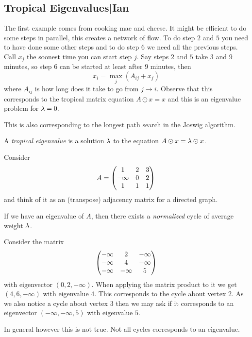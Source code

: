 \documentclass[12pt]{memoir}
\begin{document}
\subsection{Tropical Eigenvalues|Ian}

\begin{Ex}
    The first example comes from cooking mac and cheese. It might be efficient to do some steps in parallel, this creates a network of flow. To do step $2$ and $5$ you need to have done some other steps and to do step $6$ we need all the previous steps. Call $x_j$ the soonest time you can start step $j$. Say steps $2$ and $5$ take $3$ and $9$ minutes, so step $6$ can be started at least after $9$ minutes, then 
    $$x_i=\max_j(A_{ij}+x_j)$$
    where $A_{ij}$ is how long does it take to go from $j\to i$. Observe that this corresponds to the tropical matrix equation $A\odot x=x$ and this is an eigenvalue problem for $\lambda=0$.
\end{Ex}

\begin{Rmk}
This is also corresponding to the longest path search in the Joswig algorithm.
\end{Rmk}

\begin{Def}
    A \emph{tropical eigenvalue} is a solution $\lambda$ to the equation $A\odot x=\lambda\odot x$.
\end{Def}

\begin{Ex}
    Consider 
    $$A=\begin{pmatrix} 1 & 2 & 3 \\ -\infty & 0 & 2 \\ 1 & 1 & 1 \end{pmatrix}$$
    and think of it as an (transpose) adjacency matrix for a directed graph. 
\end{Ex}

\begin{Lem}
If we have an eigenvalue of $A$, then there exists a \emph{normalized} cycle of average weight $\lambda$.
\end{Lem}

\begin{Ex}
    Consider the matrix 
    $$\begin{pmatrix} -\infty & 2 & -\infty \\ -\infty & 4 & -\infty \\ -\infty & -\infty & 5 \end{pmatrix}$$
    with eigenvector $(0,2,-\infty)$. When applying the matrix product to it we get $(4,6,-\infty)$ with eigenvalue $4$. This corresponds to the cycle about vertex $2$. As we also notice a cycle about vertex $3$ then we may ask if it corresponds to an eigenvector $(-\infty,-\infty,5)$ with eigenvalue $5$.
\end{Ex}

In general however this is not true. Not all cycles corresponds to an eigenvalue.
\end{document}
